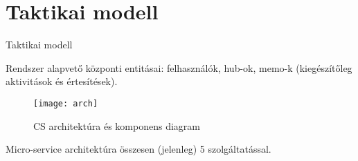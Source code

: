 \section{Taktikai modell}

\begin{frame}{Taktikai modell}

    \begin{center}
        Rendszer alapvető központi entitásai: felhasználók, hub-ok, memo-k (kiegészítőleg aktivitások és értesítések).
    \end{center}

    \begin{figure}[htbp]
        \centering
        \texttt{[image: arch]}
        \caption{CS architektúra és komponens diagram}
    \end{figure}

    \begin{center}
        Micro-service architektúra összesen (jelenleg) 5 szolgáltatással.
    \end{center}

\end{frame}